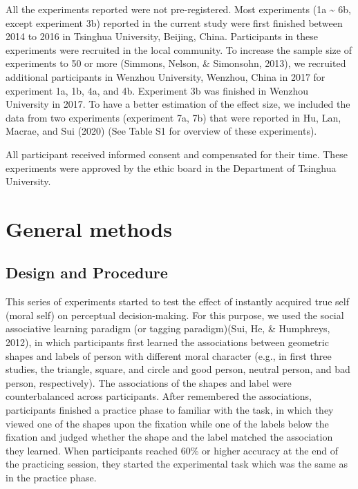 \documentclass[
  english,
  man]{apa6}
\begin{document}
All the experiments reported were not pre-registered. Most experiments (1a \textasciitilde{} 6b, except experiment 3b) reported in the current study were first finished between 2014 to 2016 in Tsinghua University, Beijing, China. Participants in these experiments were recruited in the local community. To increase the sample size of experiments to 50 or more (Simmons, Nelson, \& Simonsohn, 2013), we recruited additional participants in Wenzhou University, Wenzhou, China in 2017 for experiment 1a, 1b, 4a, and 4b. Experiment 3b was finished in Wenzhou University in 2017. To have a better estimation of the effect size, we included the data from two experiments (experiment 7a, 7b) that were reported in Hu, Lan, Macrae, and Sui (2020) (See Table S1 for overview of these experiments).

All participant received informed consent and compensated for their time. These experiments were approved by the ethic board in the Department of Tsinghua University.

\hypertarget{general-methods}{%
\section{General methods}\label{general-methods}}

\hypertarget{design-and-procedure}{%
\subsection{Design and Procedure}\label{design-and-procedure}}

This series of experiments started to test the effect of instantly acquired true self (moral self) on perceptual decision-making. For this purpose, we used the social associative learning paradigm (or tagging paradigm)(Sui, He, \& Humphreys, 2012), in which participants first learned the associations between geometric shapes and labels of person with different moral character (e.g., in first three studies, the triangle, square, and circle and good person, neutral person, and bad person, respectively). The associations of the shapes and label were counterbalanced across participants. After remembered the associations, participants finished a practice phase to familiar with the task, in which they viewed one of the shapes upon the fixation while one of the labels below the fixation and judged whether the shape and the label matched the association they learned. When participants reached 60\% or higher accuracy at the end of the practicing session, they started the experimental task which was the same as in the practice phase.
\end{document}
